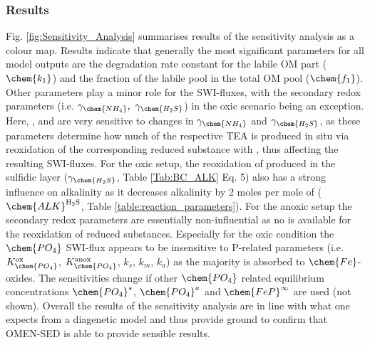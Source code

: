 \documentclass[gmd, manuscript]{copernicus}
\begin{document}
\subsubsection{Results}
Fig. \ref{fig:Sensitivity_Analysis} summarises results of the sensitivity analysis as a colour map. 
Results indicate that generally the most significant parameters for all model outputs are the degradation rate constant for the labile OM part ($\chem{k_1}$) and the fraction of the labile pool in the total OM pool ($\chem{f_1}$). 
Other parameters play a minor role for the SWI-fluxes, with the secondary redox parameters (i.e. $\gamma_\chem{NH_4},\ \gamma_\chem{H_2S}$) in the oxic scenario being an exception.
Here, ,  and  are very sensitive to changes in $\gamma_\chem{NH_4}$ and $\gamma_\chem{H_2S}$, as these parameters determine how much of the respective TEA is produced in situ via reoxidation 
of the corresponding reduced substance with , thus affecting the resulting SWI-fluxes. For the oxic setup, the reoxidation of  produced in the sulfidic layer ($\gamma_\chem{H_2S}$, Table \ref{Tab:BC_ALK} Eq. 5) 
also has a strong influence on alkalinity as it decreases alkalinity by 2 moles per mole of  ($\chem{ALK}^\mathrm{H_2S}$, Table \ref{table:reaction_parameters}). 
For the anoxic setup the secondary redox parameters are essentially non-influential as no  is available for the reoxidation of reduced substances. 
Especially for the oxic condition the $\chem{PO_4}$ SWI-flux appears to be insensitive to P-related parameters (i.e. $K_\chem{PO_4}^\mathrm{ox}$, $K_\chem{PO_4}^\mathrm{anox}$, $k_s$, $k_m$, $k_a$) as the majority is absorbed to $\chem{Fe}$-oxides. 
The sensitivities change if other $\chem{PO_4}$ related equilibrium concentrations $\chem{PO_4}^s$, $\chem{PO_4}^a$ and $\chem{FeP}^\infty$ are used (not shown).
Overall the results of the sensitivity analysis are in line with what one expects from a diagenetic model and thus provide ground to confirm  that OMEN-SED is able to provide sensible results.

\end{document}
